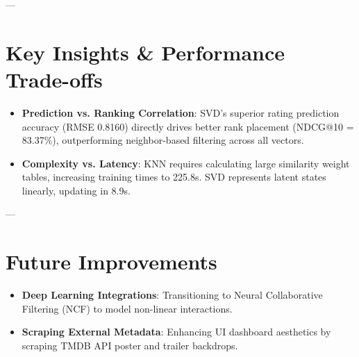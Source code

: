 \documentclass[11pt,a4paper]{article}
\begin{document}
---

\section{Key Insights \& Performance Trade-offs}
\begin{itemize}
    \item \textbf{Prediction vs. Ranking Correlation}: SVD's superior rating prediction accuracy (RMSE 0.8160) directly drives better rank placement (NDCG@10 = 83.37\%), outperforming neighbor-based filtering across all vectors.
    \item \textbf{Complexity vs. Latency}: KNN requires calculating large similarity weight tables, increasing training times to 225.8s. SVD represents latent states linearly, updating in 8.9s.
\end{itemize}

---

\section{Future Improvements}
\begin{itemize}
    \item \textbf{Deep Learning Integrations}: Transitioning to Neural Collaborative Filtering (NCF) to model non-linear interactions.
    \item \textbf{Scraping External Metadata}: Enhancing UI dashboard aesthetics by scraping TMDB API poster and trailer backdrops.
\end{itemize}
\end{document}
